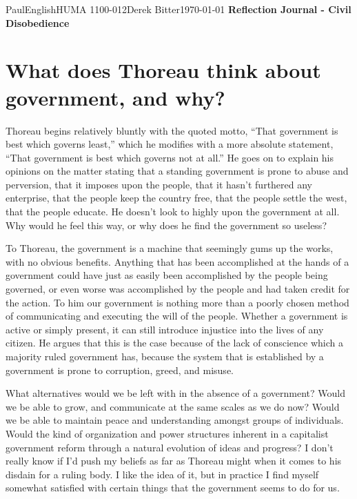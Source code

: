 \documentclass[12pt,letterpaper]{article}
\begin{document}
\begin{mla}{Paul}{English}{HUMA 1100-012}{Derek
    Bitter}{\today}    
    {\textbf{Reflection Journal - Civil Disobedience}}

\section*{What does Thoreau think about government, and why?}

Thoreau begins relatively bluntly with the quoted motto, ``That government is best which governs least,'' which he modifies with a more absolute statement, ``That government is best which governs not at all.'' He goes on to explain his opinions on the matter stating that a standing government is prone to abuse and perversion, that it imposes upon the people, that it hasn't furthered any enterprise, that the people keep the country free, that the people settle the west, that the people educate. He doesn't look to highly upon the government at all. Why would he feel this way, or why does he find the government so useless?

To Thoreau, the government is a machine that seemingly gums up the works, with no obvious benefits. Anything that has been accomplished at the hands of a government could have just as easily been accomplished by the people being governed, or even worse was accomplished by the people and had taken credit for the action. To him our government is nothing more than a poorly chosen method of communicating and executing the will of the people. Whether a government is active or simply present, it can still introduce injustice into the lives of any citizen. He argues that this is the case because of the lack of conscience which a majority ruled government has, because the system that is established by a government is prone to corruption, greed, and misuse.

What alternatives would we be left with in the absence of a government? Would we be able to grow, and communicate at the same scales as we do now? Would we be able to maintain peace and understanding amongst groups of individuals. Would the kind of organization and power structures inherent in a capitalist government reform through a natural evolution of ideas and progress? I don't really know if I'd push my beliefs as far as Thoreau might when it comes to his disdain for a ruling body. I like the idea of it, but in practice I find myself somewhat satisfied with certain things that the government seems to do for us.


\end{mla}
\end{document}
